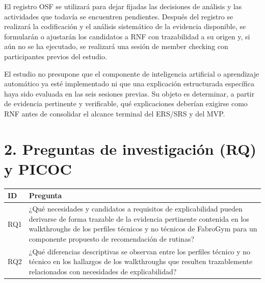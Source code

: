\documentclass[9pt,a4paper]{extarticle}
\begin{document}
El registro OSF se utilizará para dejar fijadas las decisiones de análisis y las actividades que todavía se encuentren pendientes. Después del registro se realizará la codificación y el análisis sistemático de la evidencia disponible, se formularán o ajustarán los candidatos a RNF con trazabilidad a su origen y, si aún no se ha ejecutado, se realizará una sesión de member checking con participantes previos del estudio.

El estudio no presupone que el componente de inteligencia artificial o aprendizaje automático ya esté implementado ni que una explicación estructurada específica haya sido evaluada en las seis sesiones previas. Su objeto es determinar, a partir de evidencia pertinente y verificable, qué explicaciones deberían exigirse como RNF antes de consolidar el alcance terminal del ERS/SRS y del MVP.

\section*{2. Preguntas de investigación (RQ) y PICOC}

\begin{longtable}{@{}p{}p{}@{}}
\toprule
\textbf{ID} & \textbf{Pregunta} \\
\midrule
\endhead
RQ1 & ¿Qué necesidades y candidatos a requisitos de explicabilidad pueden derivarse de forma trazable de la evidencia pertinente contenida en los walkthroughs de los perfiles técnicos y no técnicos de FabroGym para un componente propuesto de recomendación de rutinas? \\
RQ2 & ¿Qué diferencias descriptivas se observan entre los perfiles técnico y no técnico en los hallazgos de los walkthroughs que resulten trazablemente relacionados con necesidades de explicabilidad? \\
\bottomrule
\end{longtable}
\end{document}
